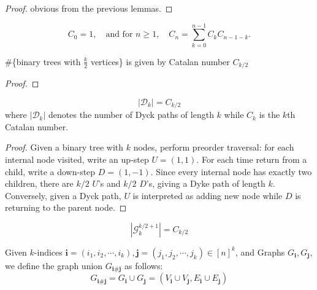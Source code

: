 \begin{proof}
  \notready
  obvious from the previous lemmas.
\end{proof}


\begin{definition}
  \mathlibok
  \label{def:Catalan_number}
  \[C_0 = 1, \quad \text{and for } n \geq 1, \quad C_n = \sum_{k=0}^{n-1} C_k C_{n-1-k}.\]
\end{definition}


\begin{lemma}
  \notready
  \label{lem:binary_tree_Catalan_number}
  \#\{binary trees with $\frac{k}{2}$ vertices\} is given by Catalan number $C_{k / 2}$
\end{lemma}

\begin{proof}
  \notready
\end{proof}


\begin{proposition}
  \notready
  \label{prop:Catalan_Dyck_samecardinality}
  \[|\mathcal{D}_k| = C_{k/2} \] where $|\mathcal{D}_k|$ denotes the number of Dyck paths of length $k$ while
  $C_k$ is the $k$th Catalan number.
\end{proposition}

\begin{proof}
  \notready
  Given a binary tree with $k$ nodes, perform preorder traversal: for each internal node visited, write
  an up-step \(U = (1,1)\). For each time return from a child, write a down-step \(D = (1,-1)\).
  Since every internal node has exactly two children, there are \(k/2\) \(U\)'s and \(k/2\) \(D\)'s,
  giving a Dyke path of length \(k\). Conversely, given a Dyck path, $U$ is interpreted as adding new node
  while $D$ is returning to the parent node.
\end{proof}


\begin{proposition}
    \notready
    \label{prop:graph_Catalan_number}
  \[|\mathcal{G}^{k/2 + 1}_k| = C_{k/2}\]
\end{proposition}


\begin{definition}
  \label{def:graph_union}
  \notready
  Given $k$-indices $\mathbf{i} = (i_1, i_2, \cdots , i_{k}), \mathbf{j} = (j_1, j_2, \cdots , j_{k}) \in [n]^{k}$,
  and Graphs $G_{\mathbf{i}}, G_{\mathbf{j}}$, we define the graph union $G_{\mathbf{i} \# \mathbf{j}}$ as follows:
  $$
  G_{\mathbf{i} \# \mathbf{j}}  = G_{\mathbf{i}} \cup G_{\mathbf{j}} = (V_{\mathbf{i}} \cup V_{\mathbf{j}}, E_{\mathbf{i}} \cup E_{\mathbf{j}})
  $$
\end{definition}


